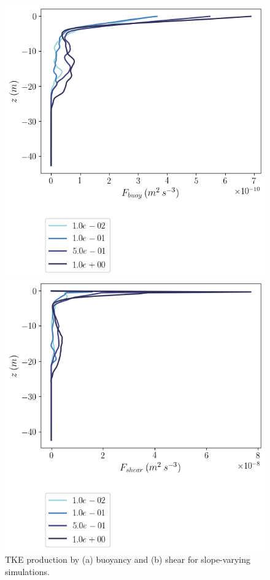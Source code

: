 \begin{figure}[H]
    \centering
    \begin{minipage}{0.5\textwidth}
        \includegraphics[trim={0 4.5cm 0 0},clip, width=\textwidth]{Figures/Fbuoy_cmp_dslope_40hr_tav1_z_profile.png}
    \end{minipage}%
    \begin{minipage}{0.5\textwidth}
        \includegraphics[trim={0 4.5cm 0 0},clip, width=\textwidth]{Figures/Fshear_cmp_dslope_40hr_tav1_z_profile.png}
    \end{minipage}
    \caption{TKE production by (a) buoyancy and (b) shear for slope-varying simulations.}
    \label{fig:tke}
\end{figure}

